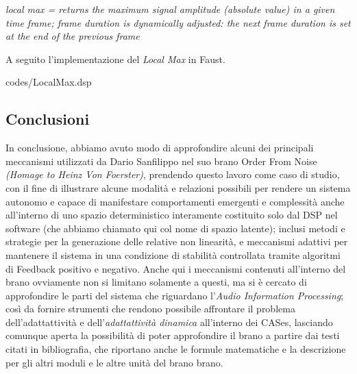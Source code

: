 \begin{center}
    \vspace{0.5cm}
    \textit{local max = returns the maximum signal amplitude (absolute value) 
    in a given time frame; frame duration is dynamically adjusted: 
    the next frame duration is set at the end of the previous frame} \\
    \vspace{0.5cm}
\end{center}

A seguito l'implementazione del \textit{Local Max} in Faust.

\vspace{0.5cm} 

{codes/LocalMax.dsp}

\subsection{Conclusioni}
\label{sec:Conclusioni}

In conclusione, abbiamo avuto modo di approfondire alcuni dei principali meccanismi 
utilizzati da Dario Sanfilippo nel suo brano Order From Noise \textit{(Homage to Heinz Von Foerster)},
prendendo questo lavoro come caso di studio, con il fine di illustrare
alcune modalità e relazioni possibili per rendere un sistema autonomo e 
capace di manifestare comportamenti emergenti e complessità anche all'interno di uno 
spazio deterministico interamente costituito solo dal DSP nel software 
(che abbiamo chiamato qui col nome di spazio latente); 
inclusi metodi e strategie per la generazione delle relative non linearità,
e meccanismi adattivi per mantenere il sistema in una condizione di stabilità
controllata tramite algoritmi di Feedback positivo e negativo.
Anche qui i meccanismi contenuti all'interno del brano ovviamente non si limitano solamente a questi,
ma si è cercato di approfondire le parti del sistema che riguardano l'\textit{Audio Information Processing};
così da fornire strumenti che rendono possibile affrontare il problema 
dell'adattattività e dell'\textit{adattattività dinamica}
all'interno dei CASes, lasciando comunque aperta la possibilità di poter approfondire il brano a partire
dai testi citati in bibliografia, che riportano anche le formule matematiche e la descrizione
per gli altri moduli e le altre unità del brano brano.